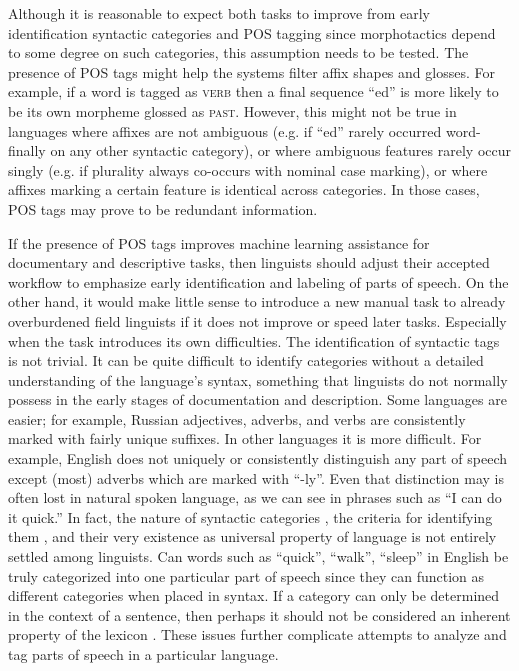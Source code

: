 Although it is reasonable to expect both tasks to improve from early identification syntactic categories and POS tagging since morphotactics depend to some degree on such categories, this assumption needs to be tested. The presence of POS tags might help the systems filter affix shapes and glosses. For example, if a word is tagged as \textsc{verb} then a final sequence ``ed'' is more likely to be its own morpheme glossed as \textsc{past}. However, this might not be true in languages where affixes are not ambiguous (e.g. if ``ed'' rarely occurred word-finally on any other syntactic category), or where ambiguous features rarely occur singly (e.g. if plurality always co-occurs with nominal case marking), or where affixes marking a certain feature is identical across categories. In those cases, POS tags may prove to be redundant information.

If the presence of POS tags improves machine learning assistance for documentary and descriptive tasks, then linguists should adjust their accepted workflow to emphasize early identification and labeling of parts of speech. On the other hand, it would make little sense to introduce a new manual task to already overburdened field linguists if it does not improve or speed later tasks. Especially when the task introduces its own difficulties. The identification of syntactic tags is not trivial. It can be quite difficult to identify categories without a detailed understanding of the language's syntax, something that linguists do not normally possess in the early stages of documentation and description. Some languages are easier; for example, Russian adjectives, adverbs, and verbs are consistently marked with fairly unique suffixes. In other languages it is more difficult. For example, English does not uniquely or consistently distinguish any part of speech except (most) adverbs which are marked with ``-ly''. Even that distinction may is often lost in natural spoken language, as we can see in phrases such as ``I can do it quick.'' In fact, the nature of  syntactic categories \citep{rauh_syntactic_2010}, the criteria for identifying them  \citep{croft_parts_2000}, and their very existence as universal property of language \citep{gil_word_2005} is not entirely settled among linguists. Can words such as ``quick'', ``walk'', ``sleep'' in English be truly categorized into one particular part of speech since they can function as different categories when placed in syntax. If a category can only be determined in the context of a sentence, then perhaps it should not be considered an inherent property of the lexicon \citep{rauh_linguistic_2016}. These issues further complicate attempts to analyze and tag parts of speech in a particular language. 

